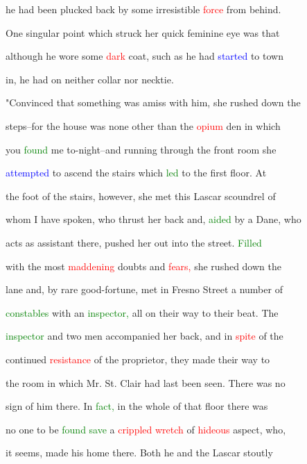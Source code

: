  he had been plucked back by some irresistible \textcolor{red}{force} from behind.

 One singular point which struck her quick feminine eye was that

 although he wore some \textcolor{red}{dark} coat, such as he had \textcolor{blue}{started} to town

 in, he had on neither collar nor necktie.



 \textcolor{BurntOrange}{"Convinced} that something was amiss with him, she rushed down the

 steps--for the house was none other than the \textcolor{red}{opium} den in which

 you \textcolor{green}{found} me to-night--and running through the front room she

 \textcolor{blue}{attempted} to ascend the stairs which \textcolor{green}{led} to the first floor. At

 the foot of the stairs, however, she met this Lascar \textcolor{BurntOrange}{scoundrel} of

 whom I have spoken, who thrust her back and, \textcolor{green}{aided} by a Dane, who

 acts as assistant there, pushed her out into the street. \textcolor{green}{Filled}

 with the most \textcolor{red}{maddening} \textcolor{BurntOrange}{doubts} and \textcolor{red}{fears,} she rushed down the

 lane and, by rare good-fortune, met in Fresno Street a number of

 \textcolor{green}{constables} with an \textcolor{green}{inspector,} all on their way to their beat. The

 \textcolor{green}{inspector} and two men accompanied her back, and in \textcolor{red}{spite} of the

 continued \textcolor{red}{resistance} of the proprietor, they made their way to

 the room in which Mr. St. Clair had last been seen. There was no

 sign of him there. In \textcolor{green}{fact,} in the whole of that floor there was

 no one to be \textcolor{green}{found} \textcolor{green}{save} a \textcolor{red}{crippled} \textcolor{red}{wretch} of \textcolor{red}{hideous} aspect, who,

 it seems, made his home there. Both he and the Lascar stoutly


